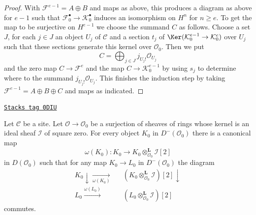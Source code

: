 \begin{proof}
\medskip\noindent
With $\mathcal{F}^{e - 1} = A \oplus B$ and maps as above,
this produces a diagram as above for $e - 1$ such that
$\mathcal{F}_0^\bullet \to \mathcal{K}_0^\bullet$
induces an isomorphism on $H^n$ for $n \geq e$.
To get the map to be surjective on $H^{e - 1}$ we choose
the summand $C$ as follows.
Choose a set $J$, for each $j \in J$ an object $U_j$ of $\mathcal{C}$
and a section $t_j$ of $\Ker(\mathcal{K}^{e - 1}_0 \to \mathcal{K}^e_0)$
over $U_j$ such that these sections generate this kernel over
$\mathcal{O}_0$. Then we put
$$
C = \bigoplus\nolimits_{j \in J} j_{U_j!}\mathcal{O}_{U_j}
$$
and the zero map $C \to \mathcal{F}^e$ and the map
$C \to \mathcal{K}_0^{e - 1}$ by using $s_j$ to determine where to the summand
$j_{U_j!}\mathcal{O}_{U_j}$. This finishes the induction step
by taking $\mathcal{F}^{e - 1} = A \oplus B \oplus C$ and
maps as indicated.
\end{proof}

\begin{lemma}
\label{defos-lemma-canonical-class}
\href{https://stacks.math.columbia.edu/tag/0DIU}{\texttt{Stacks tag 0DIU}}

Let $\mathcal{C}$ be a site. Let $\mathcal{O} \to \mathcal{O}_0$
be a surjection of sheaves of rings whose kernel is an ideal sheaf
$\mathcal{I}$ of square zero. For every object
$K_0$ in $D^-(\mathcal{O}_0)$ there is a canonical map
$$
\omega(K_0) :
K_0 \longrightarrow
K_0 \otimes_{\mathcal{O}_0}^\mathbf{L} \mathcal{I}[2]
$$
in $D(\mathcal{O}_0)$ such that for any map
$K_0 \to L_0$ in $D^-(\mathcal{O}_0)$ the diagram
$$
\begin{array}{ccc}K_0 \downarrow\underset{\omega(K_0)}{\longrightarrow} &  & (K_0 \otimes^\mathbf{L}_{\mathcal{O}_0} \mathcal{I})[2] \downarrow \\ L_0 \overset{\omega(L_0)}{\longrightarrow} &  & (L_0 \otimes^\mathbf{L}_{\mathcal{O}_0} \mathcal{I})[2]\end{array}
$$
commutes.
\end{lemma}

